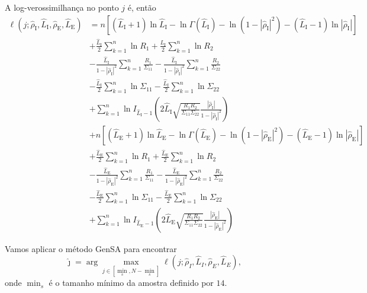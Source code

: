 A log-verossimilhança no ponto $j$ é, então
\begin{equation}\label{eq:TotalLogLikelihood}
\begin{split}
\ell(j;\widehat{\rho}_\text{I}, \widehat{L}_\text{I}, \widehat{\rho}_\text{E}, \widehat{L}_\text{E})&=n\left[(\widehat{L}_\text{I}+1)\ln \widehat{L}_\text{I} - \ln\Gamma(\widehat{L}_\text{I})- \ln(1-|\widehat{\rho}_\text{I}|^2)-(\widehat{L}_\text{I}-1)\ln|\widehat{\rho}_\text{I}|\right] \\
                        &+\frac{\widehat{L}_\text{I}}{2}\sum_{k=1}^{n} \ln R_1 +\frac{\widehat{L}_\text{I}}{2} \sum_{k=1}^{n}\ln R_2\\
                        &-\frac{\widehat{L}_\text{I}}{1-|\widehat{\rho}_\text{I}|^2}\sum_{k=1}^{n}\frac{R_1}{\Sigma_{11}}-\frac{\widehat{L}_\text{I}}{1-|\widehat{\rho}_\text{I}|^2}\sum_{k=1}^{n}\frac{R_2}{\Sigma_{22}}\\
	&-\frac{\widehat{L}_\text{I}}{2}\sum_{k=1}^{n}\ln\Sigma_{11}-\frac{\widehat{L}_\text{I}}{2}\sum_{k=1}^{n}\ln\Sigma_{22} \\
	&+\sum_{k=1}^{n}\ln I_{\widehat{L}_\text{I}-1}\left(2\widehat{L}_\text{I}\sqrt{\frac{R_1R_2}{\Sigma_{11}\Sigma_{22}}}\frac{|\widehat{\rho}_\text{I}|}{1-|\widehat{\rho}_\text{I}|^2}\right)\\
	&+n\left[(\widehat{L}_\text{E}+1)\ln \widehat{L}_\text{E} - \ln\Gamma(\widehat{L}_\text{E})- \ln(1-|\widehat{\rho}_\text{E}|^2)-(\widehat{L}_\text{E}-1)\ln|\widehat{\rho}_\text{E}|\right] \\
                        &+\frac{\widehat{L}_\text{E}}{2}\sum_{k=1}^{n} \ln R_1 +\frac{\widehat{L}_\text{E}}{2} \sum_{k=1}^{n}\ln R_2\\
                        &-\frac{\widehat{L}_\text{E}}{1-|\widehat{\rho}_\text{E}|^2}\sum_{k=1}^{n}\frac{R_1}{\Sigma_{11}}-\frac{\widehat{L}_\text{E}}{1-|\widehat{\rho}_\text{E}|^2}\sum_{k=1}^{n}\frac{R_2}{\Sigma_{22}}\\
	&-\frac{\widehat{L}_\text{E}}{2}\sum_{k=1}^{n}\ln\Sigma_{11}-\frac{\widehat{L}_\text{E}}{2}\sum_{k=1}^{n}\ln\Sigma_{22} \\
	&+\sum_{k=1}^{n}\ln I_{\widehat{L}_\text{E}-1}\left(2\widehat{L}_\text{E}\sqrt{\frac{R_1R_2}{\Sigma_{11}\Sigma_{22}}}\frac{|\widehat{\rho}_\text{E}|}{1-|\widehat{\rho}_\text{E}|^2}\right)
\end{split}
\end{equation}

Vamos aplicar o método GenSA para encontrar
$$
\widehat{\jmath}= \arg\max\limits_{j\in [\min_s,N-\min_s]}\ell(j;\widehat{\rho}_I, \widehat{L}_I,\widehat{\rho}_E, \widehat{L}_E),
$$ 
onde $\min_s$ é o tamanho mínimo da amostra definido por $14$.

